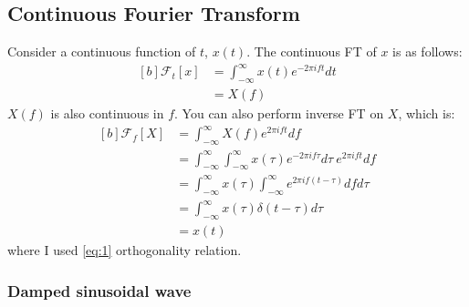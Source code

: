 \documentclass[letterpaper, 11pt]{article}
\newcommand{\fourier}[2]{\mathcal{F}_{#1}[#2]}
\newcommand{\fint}{\int_{-\infty}^{\infty}}
\numberwithin{equation}{section}
\begin{document}
\subsection{Continuous Fourier Transform}
Consider a continuous function of \(t\), \(x(t)\). The continuous FT of \(x\) is as follows:
\begin{equation}
	\begin{aligned}[b]
		\fourier{t}{x}	&= \fint x(t)e^{-2\pi ift} dt \\
				&= X(f)
	\end{aligned}
\end{equation}
\(X(f)\) is also continuous in \(f\). You can also perform inverse FT on \(X\), which is:
\begin{equation}
	\begin{aligned}[b]
		\fourier{f}{X}	&= \fint X(f)e^{2\pi ift} df \\
				&= \fint \fint x(\tau)e^{-2\pi if\tau} d\tau\ e^{2\pi ift} df \\
				&= \fint x(\tau) \fint e^{2\pi if(t - \tau)} df d\tau \\
				&= \fint x(\tau) \delta (t - \tau) d\tau \\
				&= x(t)
	\end{aligned}
\end{equation}
where I used \eqref{eq:1} orthogonality relation.

\subsubsection{Damped sinusoidal wave}
\printindex
\end{document}

